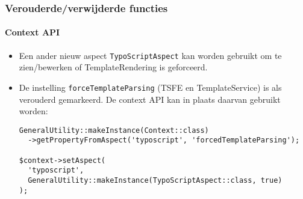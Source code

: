
\begin{frame}[fragile]
	\frametitle{Verouderde/verwijderde functies}
	\framesubtitle{Context API}

	\lstset{basicstyle=\tiny\ttfamily}

	\begin{itemize}

		\item Een ander nieuw aspect \texttt{TypoScriptAspect} kan worden gebruikt om te zien/bewerken of
			TemplateRendering is geforceerd.

		\item De instelling \texttt{forceTemplateParsing} (TSFE en TemplateService) is als verouderd gemarkeerd.
			De context API kan in plaats daarvan gebruikt worden:

\begin{lstlisting}
GeneralUtility::makeInstance(Context::class)
  ->getPropertyFromAspect('typoscript', 'forcedTemplateParsing');

$context->setAspect(
  'typoscript',
  GeneralUtility::makeInstance(TypoScriptAspect::class, true)
);
\end{lstlisting}

	\end{itemize}

\end{frame}


